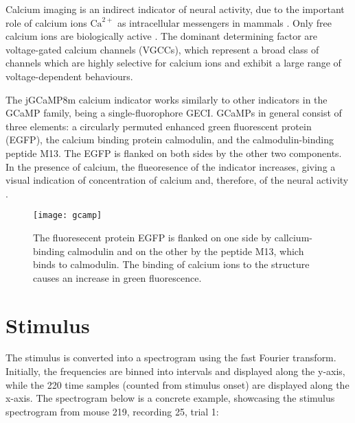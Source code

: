 Calcium imaging is an indirect indicator of neural activity, due to the important role of calcium ions $\mathrm{Ca}^{2+}$ as intracellular messengers in mammals \parencite{grienbergerImagingCalciumNeurons2012}. Only free calcium ions are biologically active \parencite{grienbergerImagingCalciumNeurons2012}. The dominant determining factor are voltage-gated calcium channels (VGCCs), which represent a broad class of channels which are highly selective for calcium ions and exhibit a large range of voltage-dependent behaviours.

The jGCaMP8m calcium indicator works similarly to other indicators in the GCaMP family, being a single-fluorophore GECI. GCaMPs in general consist of three elements: a circularly permuted enhanced green fluorescent protein (EGFP), the calcium binding protein calmodulin, and the calmodulin-binding peptide M13. The EGFP is flanked on both sides by the other two components. In the presence of calcium, the flueoresence of the indicator increases, giving a visual indication of concentration of calcium and, therefore, of the neural activity \parencite{grienbergerImagingCalciumNeurons2012}.

\begin{figure}[ht]
	\centering
	\texttt{[image: gcamp]}
	\caption{The fluoresecent protein EGFP is flanked on one side by callcium-binding calmodulin and on the other by the peptide M13, which binds to calmodulin. The binding of calcium ions to the structure causes an increase in green fluorescence. \parencite{grienbergerImagingCalciumNeurons2012}}
\end{figure}



\section{Stimulus}

The stimulus is converted into a spectrogram using the fast Fourier transform. Initially, the frequencies are binned into intervals and displayed along the y-axis, while the 220 time samples (counted from stimulus onset) are displayed along the x-axis. The spectrogram below is a concrete example, showcasing the stimulus spectrogram from mouse 219, recording 25, trial 1:

